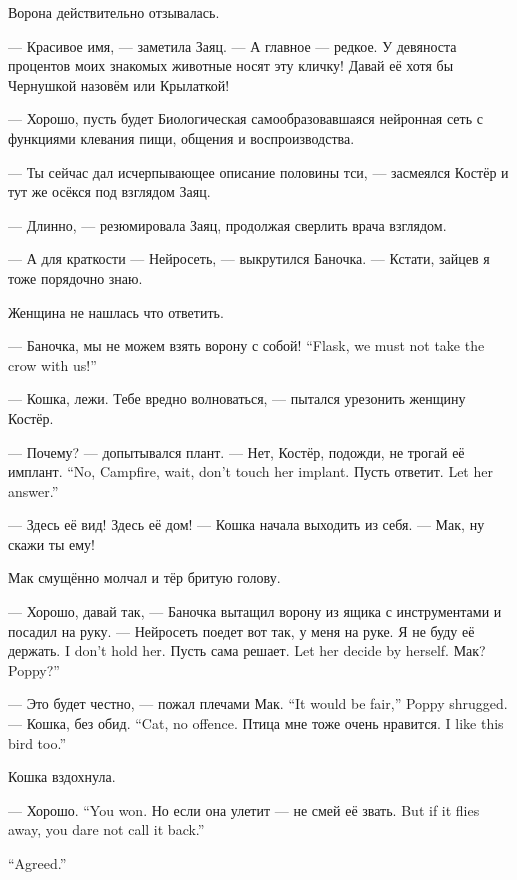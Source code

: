 Ворона действительно отзывалась.

--- Красивое имя, --- заметила Заяц.
--- А главное --- редкое.
У девяноста процентов моих знакомых животные носят эту кличку!
Давай её хотя бы Чернушкой назовём или Крылаткой!

--- Хорошо, пусть будет Биологическая самообразовавшаяся нейронная сеть с функциями клевания пищи, общения и воспроизводства.

--- Ты сейчас дал исчерпывающее описание половины тси, --- засмеялся Костёр и тут же осёкся под взглядом Заяц.

--- Длинно, --- резюмировала Заяц, продолжая сверлить врача взглядом.

--- А для краткости --- Нейросеть, --- выкрутился Баночка.
--- Кстати, зайцев я тоже порядочно знаю.

Женщина не нашлась что ответить.

\asterism

{--- Баночка, мы не можем взять ворону с собой!}
{``Flask, we must not take the crow with us!''}

--- Кошка, лежи.
Тебе вредно волноваться, --- пытался урезонить женщину Костёр.

--- Почему? --- допытывался плант.
{--- Нет, Костёр, подожди, не трогай её имплант.}
{``No, Campfire, wait, don't touch her implant.}
{Пусть ответит.}
{Let her answer.''}

--- Здесь её вид!
Здесь её дом! --- Кошка начала выходить из себя.
--- Мак, ну скажи ты ему!

Мак смущённо молчал и тёр бритую голову.

--- Хорошо, давай так, --- Баночка вытащил ворону из ящика с инструментами и посадил на руку.
--- Нейросеть поедет вот так, у меня на руке.
{Я не буду её держать.}
{I don't hold her.}
{Пусть сама решает.}
{Let her decide by herself.}
{Мак?}
{Poppy?''}

{--- Это будет честно, --- пожал плечами Мак.}
{``It would be fair,'' Poppy shrugged.}
{--- Кошка, без обид.}
{``Cat, no offence.}
{Птица мне тоже очень нравится.}
{I like this bird too.''}

Кошка вздохнула.

{--- Хорошо.}
{``You won.}
{Но если она улетит --- не смей её звать.}
{But if it flies away, you dare not call it back.''}

{``Agreed.''}

